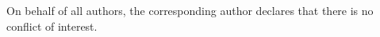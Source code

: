 \documentclass[runningheads]{llncs}
\let\Oldsubsubsection\subsubsection
\renewcommand{\subsubsection}{\FloatBarrier\Oldsubsubsection}
\newcommand{\explicit}{explicit}
\newcommand{\HC}{HDVF}
\newcommand{\HCs}{HDVFs}
\newcommand{\commentYS}[1]{{\textit{\color{blue}\textbf{YS}: #1}}}
\begin{document}

\subsubsection{\discintname}
On behalf of all authors, the corresponding author declares that there is no conflict of
interest.

%
%
%
% 

\end{document}
